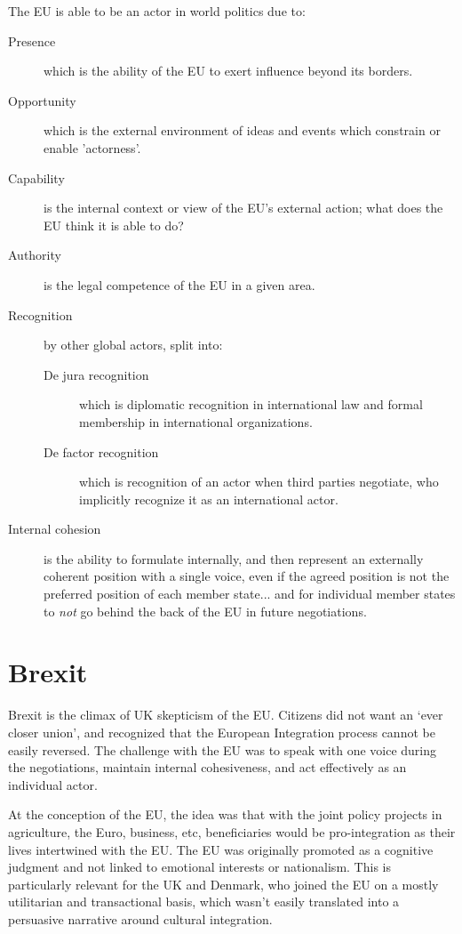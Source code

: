 The EU is able to be an actor in world politics due to:

\begin{description}
  \item[Presence] which is the ability of the EU to exert influence
    beyond its borders.
  \item[Opportunity] which is the external environment of ideas and
    events which constrain or enable 'actorness'.
  \item[Capability] is the internal context or view of the EU's
    external action; what does the EU think it is able to do?
  \item[Authority] is the legal competence of the EU in a given area.
  \item[Recognition] by other global actors, split into:
    \begin{description}
      \item[De jura recognition] which is diplomatic recognition in
        international law and formal membership in international
        organizations.
      \item[De factor recognition] which is recognition of an actor
        when third parties negotiate, who implicitly recognize it as an
        international actor.
    \end{description}
  \item[Internal cohesion] is the ability to formulate internally, and
    then represent an externally coherent position with a single
    voice, even if the agreed position is not the preferred position
    of each member state... and for individual member states to
    \textit{not} go behind the back of the EU in future negotiations.
\end{description}

\section{Brexit}

Brexit is the climax of UK skepticism of the EU. Citizens did not want
an `ever closer union', and recognized that the European Integration
process cannot be easily reversed. The challenge with the EU was to
speak with one voice during the negotiations, maintain internal
cohesiveness, and act effectively as an individual actor.

At the conception of the EU, the idea was that with the joint policy
projects in agriculture, the Euro, business, etc, beneficiaries would
be pro-integration as their lives intertwined with the EU. The EU was
originally promoted as a cognitive judgment and not linked to
emotional interests or nationalism. This is particularly relevant for
the UK and Denmark, who joined the EU on a mostly utilitarian and
transactional basis, which wasn't easily translated into a persuasive
narrative around cultural integration.

